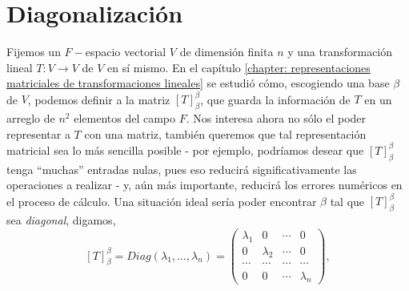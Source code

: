 \chapter{Diagonalización}


Fijemos un $F-$espacio vectorial $V$ de dimensión finita $n$
y una
transformación lineal $T: V \longrightarrow V$ de $V$ en sí mismo.
En el capítulo 
\ref{chapter: representaciones matriciales de transformaciones lineales}
se estudió cómo, escogiendo 
una base $\beta$ de $V$, podemos definir a la matriz
$[T]_{\beta}^{\beta}$, que guarda la información de $T$ en un arreglo 
de $n^{2}$ elementos del campo $F$. 
Nos interesa ahora no sólo el poder representar
a $T$ con una matriz, también queremos que 
tal representación matricial sea lo más sencilla posible - por ejemplo,
podríamos desear que $[T]_{\beta}^{\beta}$ tenga ``muchas'' entradas nulas,
pues eso reducirá significativamente las operaciones a realizar - y, aún más importante, 
reducirá los errores numéricos en el proceso de cálculo. 
Una situación ideal sería poder encontrar $\beta$ tal que 
$[T]_{\beta}^{\beta}$ sea \textit{diagonal}, digamos, 
\begin{equation}
	\label{eq: repr diagonal, 1}
	[T]_{\beta}^{\beta} = Diag(\lambda_{1}, \ldots , \lambda_{n})
	= \begin{pmatrix}
		\lambda_{1} & 0 & \cdots & 0 \\
		0 & \lambda_{2} & \cdots & 0 \\
		\cdots & \cdots & \cdots & \cdots \\
		0 & 0 & \cdots & \lambda_{n}
	\end{pmatrix}
	,
\end{equation}
